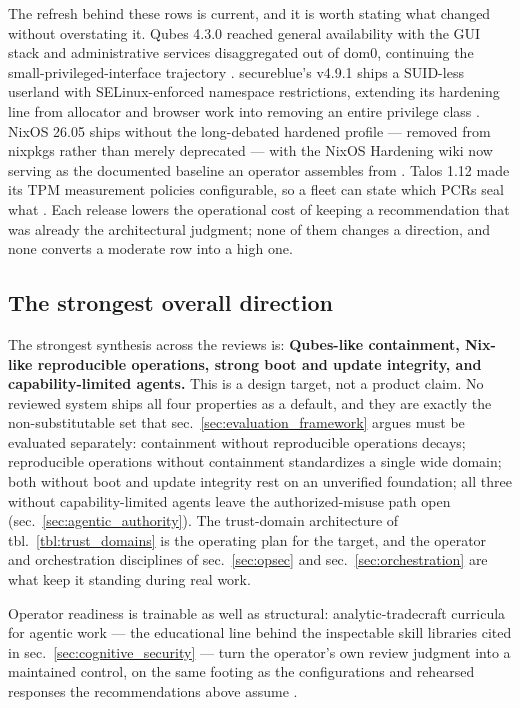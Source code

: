 \documentclass[
  english,
  9pt,
]{extarticle}
\newcounter{none} %
\begin{document}
The refresh behind these rows is current, and it is worth stating what
changed without overstating it. Qubes 4.3.0 reached general availability
with the GUI stack and administrative services disaggregated out of
dom0, continuing the small-privileged-interface trajectory
\citep{qubes_430_release}. secureblue's v4.9.1 ships a SUID-less
userland with SELinux-enforced namespace restrictions, extending its
hardening line from allocator and browser work into removing an entire
privilege class \citep{secureblue_v491}. NixOS 26.05 ships without the
long-debated hardened profile --- removed from nixpkgs rather than
merely deprecated \citep{nix_hardened_removed} --- with the NixOS
Hardening wiki now serving as the documented baseline an operator
assembles from \citep{nixos_hardening_wiki}. Talos 1.12 made its TPM
measurement policies configurable, so a fleet can state which PCRs seal
what \citep{talos_1_12_notes}. Each release lowers the operational cost
of keeping a recommendation that was already the architectural judgment;
none of them changes a direction, and none converts a moderate row into
a high one.

\subsection{The strongest overall
direction}\label{the-strongest-overall-direction}

The strongest synthesis across the reviews is: \textbf{Qubes-like
containment, Nix-like reproducible operations, strong boot and update
integrity, and capability-limited agents.} This is a design target, not
a product claim. No reviewed system ships all four properties as a
default, and they are exactly the non-substitutable set that
sec.~\ref{sec:evaluation_framework} argues must be evaluated separately:
containment without reproducible operations decays; reproducible
operations without containment standardizes a single wide domain; both
without boot and update integrity rest on an unverified foundation; all
three without capability-limited agents leave the authorized-misuse path
open (sec.~\ref{sec:agentic_authority}). The trust-domain architecture
of tbl.~\ref{tbl:trust_domains} is the operating plan for the target,
and the operator and orchestration disciplines of sec.~\ref{sec:opsec}
and sec.~\ref{sec:orchestration} are what keep it standing during real
work.

Operator readiness is trainable as well as structural:
analytic-tradecraft curricula for agentic work --- the educational line
behind the inspectable skill libraries cited in
sec.~\ref{sec:cognitive_security} --- turn the operator's own review
judgment into a maintained control, on the same footing as the
configurations and rehearsed responses the recommendations above assume
\citep{ageint2026}.
\end{document}
